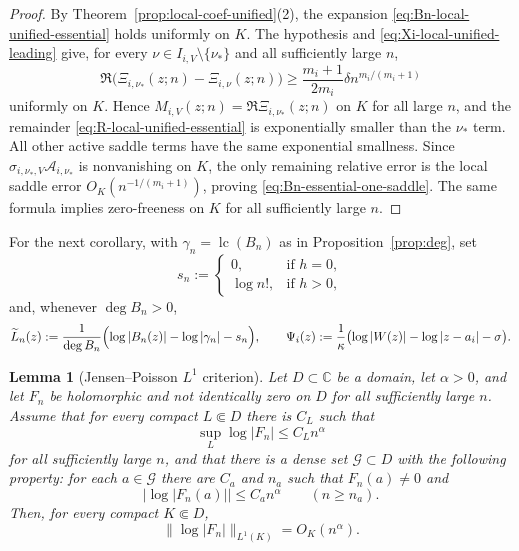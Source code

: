 \documentclass[reqno]{article}
\newtheorem{lem}[theorem]{Lemma}
\theoremstyle{definition}
\theoremstyle{remark}
\theoremstyle{plain}
\newcommand{\C}{\mathbb C}
\newcommand{\lc}{\operatorname{lc}}
\begin{document}
\begin{proof}
By Theorem~\ref{prop:local-coef-unified}\textup{(2)}, the expansion \eqref{eq:Bn-local-unified-essential} holds uniformly on $K$. The hypothesis and \eqref{eq:Xi-local-unified-leading} give, for every $\nu\in I_{i,V}\setminus\{\nu_\ast\}$ and all sufficiently large $n$,
$$
\Re\bigl(\Xi_{i,\nu_\ast}(z;n)-\Xi_{i,\nu}(z;n)\bigr)
\ge \frac{m_i+1}{2m_i}\delta n^{m_i/(m_i+1)}
$$
uniformly on $K$. Hence $M_{i,V}(z;n)=\Re\Xi_{i,\nu_\ast}(z;n)$ on $K$ for all large $n$, and the remainder \eqref{eq:R-local-unified-essential} is exponentially smaller than the $\nu_\ast$ term. All other active saddle terms have the same exponential smallness. Since $\sigma_{i,\nu_\ast,V}\mathcal A_{i,\nu_\ast}$ is nonvanishing on $K$, the only remaining relative error is the local saddle error $O_K(n^{-1/(m_i+1)})$, proving \eqref{eq:Bn-essential-one-saddle}. The same formula implies zero-freeness on $K$ for all sufficiently large $n$.
\end{proof}

For the next corollary, with $\gamma_n=\lc(B_n)$ as in Proposition~\ref{prop:deg}, set
$$s_n:=
\begin{cases}
0, & \text{if } h=0,\\
\log n!, & \text{if } h>0,
\end{cases}$$
and, whenever $\deg B_n>0$,
$$\widetilde L_n(z):=\frac{1}{\deg B_n}\Bigl(\log|B_n(z)|-\log|\gamma_n|-s_n\Bigr),\qquad
\Psi_i(z):=\frac{1}{\kappa}\bigl(\log|W(z)|-\log|z-a_i|-\sigma\bigr).$$

\begin{lem}[Jensen--Poisson $L^1$ criterion]\label{lem:jensen-poisson-l1}
Let $D\subset\C$ be a domain, let $\alpha>0$, and let $F_n$ be holomorphic and not identically zero on $D$ for all sufficiently large $n$. Assume that for every compact $L\Subset D$ there is $C_L$ such that
$$\sup_L\log|F_n|\le C_L n^\alpha$$
for all sufficiently large $n$, and that there is a dense set $\mathcal G\subset D$ with the following property: for each $a\in\mathcal G$ there are $C_a$ and $n_a$ such that $F_n(a)\ne0$ and
$$|\log|F_n(a)||\le C_a n^\alpha\qquad(n\ge n_a).$$
Then, for every compact $K\Subset D$,
$$\|\log|F_n|\|_{L^1(K)}=O_K(n^\alpha).$$
\end{lem}
\end{document}
